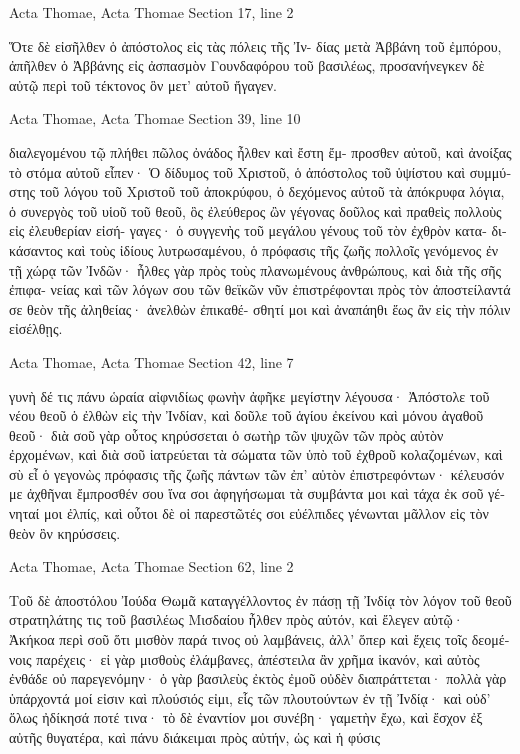 \documentclass[12pt,letterpaper,twoside,final]{memoir}
\begin{document}
\begin{greek}
Acta Thomae, Acta Thomae 
Section 17, line 2

Ὅτε δὲ εἰσῆλθεν ὁ ἀπόστολος εἰς τὰς πόλεις τῆς Ἰν-
δίας μετὰ Ἀββάνη τοῦ ἐμπόρου, ἀπῆλθεν ὁ Ἀββάνης εἰς 
ἀσπασμὸν Γουνδαφόρου τοῦ βασιλέως, προσανήνεγκεν δὲ 
αὐτῷ περὶ τοῦ τέκτονος ὃν μετ' αὐτοῦ ἤγαγεν. 



Acta Thomae, Acta Thomae 
Section 39, line 10

διαλεγομένου τῷ πλήθει πῶλος ὀνάδος ἦλθεν καὶ ἔστη ἔμ-
προσθεν αὐτοῦ, καὶ ἀνοίξας τὸ στόμα αὐτοῦ εἶπεν· Ὁ δίδυμος 
τοῦ Χριστοῦ, ὁ ἀπόστολος τοῦ ὑψίστου καὶ συμμύστης τοῦ 
λόγου τοῦ Χριστοῦ τοῦ ἀποκρύφου, ὁ δεχόμενος αὐτοῦ τὰ 
ἀπόκρυφα λόγια, ὁ συνεργὸς τοῦ υἱοῦ τοῦ θεοῦ, ὃς ἐλεύθερος 
ὢν γέγονας δοῦλος καὶ πραθεὶς πολλοὺς εἰς ἐλευθερίαν εἰσή-
γαγες· ὁ συγγενὴς τοῦ μεγάλου γένους τοῦ τὸν ἐχθρὸν κατα-
δικάσαντος καὶ τοὺς ἰδίους λυτρωσαμένου, ὁ πρόφασις τῆς 
ζωῆς πολλοῖς γενόμενος ἐν τῇ χώρᾳ τῶν Ἰνδῶν· ἦλθες γὰρ 
πρὸς τοὺς πλανωμένους ἀνθρώπους, καὶ διὰ τῆς σῆς ἐπιφα-
νείας καὶ τῶν λόγων σου τῶν θεϊκῶν νῦν ἐπιστρέφονται πρὸς 
τὸν ἀποστείλαντά σε θεὸν τῆς ἀληθείας· ἀνελθὼν ἐπικαθέ-
σθητί μοι καὶ ἀναπάηθι ἕως ἂν εἰς τὴν πόλιν εἰσέλθῃς. 



Acta Thomae, Acta Thomae 
Section 42, line 7

                                                     γυνὴ δέ τις πάνυ 
ὡραία αἰφνιδίως φωνὴν ἀφῆκε μεγίστην λέγουσα· 
 Ἀπόστολε τοῦ νέου θεοῦ ὁ ἐλθὼν εἰς τὴν Ἰνδίαν, καὶ 
δοῦλε τοῦ ἁγίου ἐκείνου καὶ μόνου ἀγαθοῦ θεοῦ· διὰ σοῦ 
γὰρ οὗτος κηρύσσεται ὁ σωτὴρ τῶν ψυχῶν τῶν πρὸς αὐτὸν 
ἐρχομένων, καὶ διὰ σοῦ ἰατρεύεται τὰ σώματα τῶν ὑπὸ τοῦ 
ἐχθροῦ κολαζομένων, καὶ σὺ εἶ ὁ γεγονὼς πρόφασις τῆς ζωῆς 
πάντων τῶν ἐπ' αὐτὸν ἐπιστρεφόντων· κέλευσόν με ἀχθῆναι 
ἔμπροσθέν σου ἵνα σοι ἀφηγήσωμαι τὰ συμβάντα μοι καὶ 
τάχα ἐκ σοῦ γένηταί μοι ἐλπίς, καὶ οὗτοι δὲ οἱ παρεστῶτές   
σοι εὐέλπιδες γένωνται μᾶλλον εἰς τὸν θεὸν ὃν κηρύσσεις. 



Acta Thomae, Acta Thomae 
Section 62, line 2

Τοῦ δὲ ἀποστόλου Ἰούδα Θωμᾶ καταγγέλλοντος ἐν 
πάσῃ τῇ Ἰνδίᾳ τὸν λόγον τοῦ θεοῦ στρατηλάτης τις τοῦ 
βασιλέως Μισδαίου ἦλθεν πρὸς αὐτόν, καὶ ἔλεγεν αὐτῷ· 
Ἀκήκοα περὶ σοῦ ὅτι μισθὸν παρά τινος οὐ λαμβάνεις, 
ἀλλ' ὅπερ καὶ ἔχεις τοῖς δεομένοις παρέχεις· εἰ γὰρ μισθοὺς 
ἐλάμβανες, ἀπέστειλα ἂν χρῆμα ἱκανόν, καὶ αὐτὸς ἐνθάδε οὐ 
παρεγενόμην· ὁ γὰρ βασιλεὺς ἐκτὸς ἐμοῦ οὐδὲν διαπράττεται· 
πολλὰ γὰρ ὑπάρχοντά μοί εἰσιν καὶ πλούσιός εἰμι, εἷς τῶν   
πλουτούντων ἐν τῇ Ἰνδίᾳ· καὶ οὐδ' ὅλως ἠδίκησά ποτέ τινα· 
τὸ δὲ ἐναντίον μοι συνέβη· γαμετὴν ἔχω, καὶ ἔσχον ἐξ αὐτῆς 
θυγατέρα, καὶ πάνυ διάκειμαι πρὸς αὐτήν, ὡς καὶ ἡ φύσις 





\end{greek}
\end{document}
